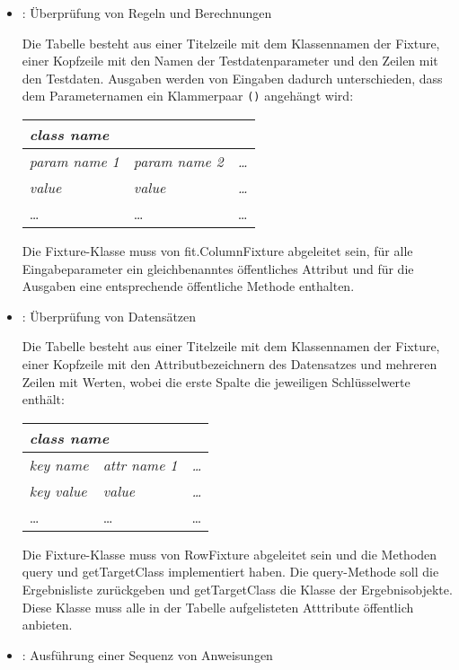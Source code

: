 \begin{itemize}
\item {}: Überprüfung von Regeln und Berechnungen

Die Tabelle besteht aus einer Titelzeile mit dem Klassennamen der Fixture,
einer Kopfzeile mit den Namen der Testdatenparameter und den Zeilen mit den
Testdaten. Ausgaben werden von Eingaben dadurch unterschieden, dass dem
Parameternamen ein Klammerpaar \verb+()+ angehängt wird:
\begin{center}
\begin{tabular}{|l|l|l|}
\hline
\multicolumn{3}{|l|}{\em class name}\\
\hline
{\em param name 1} & {\em param name 2}& {\em \ldots} \\
\hline
{\em value} & {\em value}& {\em \ldots} \\
\ldots & \ldots & \ldots \\
\hline
\end{tabular}
\end{center}
Die Fixture-Klasse muss von fit.ColumnFixture abgeleitet sein, für alle
Eingabeparameter ein gleichbenanntes öffentliches Attribut und für
die Ausgaben eine entsprechende öffentliche Methode enthalten.
%
\newslide
\item {}: Überprüfung von Datensätzen

Die Tabelle besteht aus einer Titelzeile mit dem Klassennamen der Fixture,
einer Kopfzeile mit den
Attributbezeichnern des Datensatzes und mehreren Zeilen mit Werten,
wobei die erste Spalte die jeweiligen Schlüsselwerte enthält:
\begin{center}
\begin{tabular}{|l|l|l|}
\hline
\multicolumn{3}{|l|}{\em class name}\\
\hline
{\em key name} & {\em attr name 1}& {\em \ldots} \\
\hline
{\em key value} & {\em value}& {\em \ldots} \\
\ldots & \ldots & \ldots \\
\hline
\end{tabular}
\end{center}
Die Fixture-Klasse muss von RowFixture abgeleitet sein und
die Methoden query und getTargetClass implementiert haben.
Die query-Methode soll die Ergebnisliste zurückgeben und getTargetClass die
Klasse der Ergebnisobjekte. Diese Klasse muss alle in der Tabelle
aufgelisteten Atttribute öffentlich anbieten.
%
\newslide
\item {}: Ausführung einer Sequenz von Anweisungen


\end{itemize}
